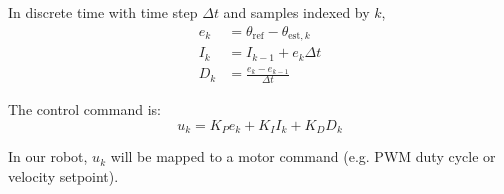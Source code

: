 \documentclass[11pt,a4paper]{article}
\begin{document}
In discrete time with time step \(\Delta t\) and samples indexed by \(k\),
\begin{align*}
e_k &= \theta_{\text{ref}} - \theta_{\text{est},k} \\
I_k &= I_{k-1} + e_k \Delta t \\
D_k &= \frac{e_k - e_{k-1}}{\Delta t}
\end{align*}

The control command is: 
\[
u_k = K_P e_k + K_I I_k + K_D D_k
\]

In our robot, \(u_k\) will be mapped to a motor command (e.g. PWM duty cycle or velocity setpoint).
\end{document}
